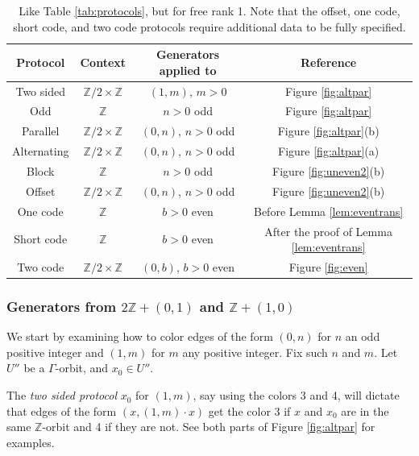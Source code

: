\documentclass[10pt,a4paper]{article}
\newcommand{\0}{\varnothing}
\newcommand{\Z}{\mathbb{Z}}
\begin{document}
\begin{table}[]
    \centering
    \begin{tabular}{| c | c | c | c |}
        \hline 
        Protocol & Context & Generators applied to & Reference \\
        \hline
        \hline
        Two sided & $\Z/2 \times \Z$ & $(1,m)$, $m > 0$ & Figure \ref{fig:altpar} \\
        \hline
        Odd & $\Z$ & $n > 0$ odd & Figure \ref{fig:altpar} \\
        \hline
        Parallel & $\Z/2 \times \Z$ & $(0,n)$, $n >0$ odd & Figure \ref{fig:altpar}(b)\\
        \hline
        Alternating & $\Z/2 \times \Z$ & $(0,n)$, $n > 0$ odd & Figure \ref{fig:altpar}(a) \\
        \hline
        Block & $\Z$ & $n > 0$ odd & Figure \ref{fig:uneven2}(b) \\
        \hline
        Offset & $\Z/2 \times \Z$ & $(0,n)$, $n > 0$ odd & Figure \ref{fig:uneven2}(b)\\
        \hline
        One code & $\Z$ & $b > 0$ even &  Before Lemma \ref{lem:eventrans}\\
        \hline
        Short code & $\Z$ & $b > 0$ even & After the proof of Lemma \ref{lem:eventrans} \\
        \hline
        Two code & $\Z/2 \times \Z$ & $(0,b)$, $b > 0$ even & Figure \ref{fig:even}\\
        \hline
        
    \end{tabular}
    \caption{Like Table \ref{tab:protocols}, but for free rank 1. Note that the offset, one code, short code, and two code protocols require additional data to be fully specified.}
    \label{tab:1protocols}
\end{table}

\subsubsection{Generators from $2\Z + (0,1)$ and $\Z + (1,0)$}\label{subsubsec:rank1base}

We start by examining how to color edges of the form $(0,n)$ for $n$ an odd positive integer and $(1,m)$ for $m$ any positive integer. Fix such $n$ and $m$. Let $U''$ be a $\Gamma$-orbit, and $x_0 \in U''$. 

The \textit{two sided protocol} $x_0$ for $(1,m)$, say using the colors 3 and 4, will dictate that edges of the form $(x,(1,m) \cdot x)$ get the color 3 if $x$ and $x_0$ are in the same $\Z$-orbit and 4 if they are not. See both parts of Figure \ref{fig:altpar} for examples.
\end{document}
